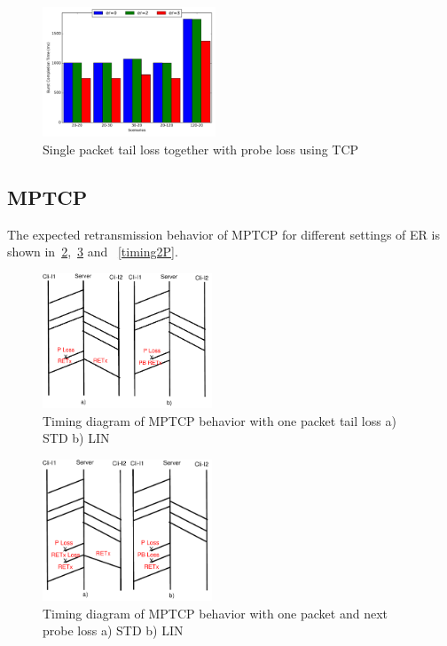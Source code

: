 \documentclass[10pt,draftcls,twocolumn]{IEEEconf}
\begin{document}
\begin{figure}[!ht]
\begin{center}
\includegraphics[angle=0, width=0.46\textwidth, natwidth=578.16,natheight=433.62]{plots/T1PP.pdf}
\caption{Single packet tail loss together with probe loss using TCP}\label{t1pp}
\end{center}
\end{figure}

\subsection{MPTCP}


The expected retransmission behavior of MPTCP for different settings of ER is shown 
in~\ref{timing1P},~\ref{timing1PP} and ~\ref{timing2P}.

\begin{figure}[!ht]
\begin{center}
\includegraphics[angle=0, width=0.45\textwidth, natwidth=610, natheight=400]{images/timing1P.pdf}
\end{center}
\caption{Timing diagram of MPTCP behavior with one packet tail loss a) STD b) LIN}\label{timing1P}
\end{figure}

\begin{figure}[!ht]
\begin{center}
\includegraphics[angle=0, width=0.45\textwidth, natwidth=610, natheight=400]{images/timing1PP.pdf}
\end{center}
\caption{Timing diagram of MPTCP behavior with one packet and next probe loss a) STD b) LIN}\label{timing1PP}
\end{figure}
\end{document}
